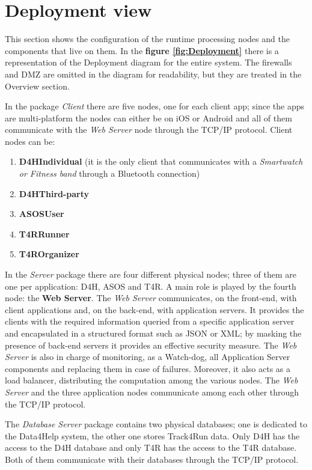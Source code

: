 \section{Deployment view}

This section shows the configuration of the runtime processing nodes and the components that live on them. In the \textbf{figure \ref{fig:Deployment}} there is a representation of the Deployment diagram for the entire system.
The firewalls and DMZ are omitted in the diagram for readability, but they are treated in the Overview section.

In the package \emph{Client} there are five nodes, one for each client app; since the apps are multi-platform the nodes can either be on iOS or Android and all of them communicate with the \emph{Web Server} node through the TCP/IP protocol. 
Client nodes can be:
\begin{enumerate}
    \item \textbf{D4HIndividual} (it is the only client that communicates with a \emph{Smartwatch or Fitness band} through a Bluetooth connection)
    \item \textbf{D4HThird-party}
    \item \textbf{ASOSUser}
    \item \textbf{T4RRunner}
    \item \textbf{T4ROrganizer}
\end{enumerate}

In the \emph{Server} package there are four different physical nodes; three of them are one per application: D4H, ASOS and T4R. A main role is played by the fourth node: the \textbf{Web Server}. The \emph{Web Server} communicates, on the front-end, with client applications and, on the back-end, with application servers. It provides the clients with the required information queried from a specific application server and encapsulated in a structured format such as JSON or XML; by masking the presence of back-end servers it provides an effective security measure. The \emph{Web Server} is also in charge of monitoring, as a Watch-dog, all Application Server components and replacing them in case of failures. Moreover, it also acts as a load balancer, distributing the computation among the various nodes.
The \emph{Web Server} and the three application nodes communicate among each other through the TCP/IP protocol.

The \emph{Database Server} package contains two physical databases; one is dedicated to the Data4Help system, the other one stores Track4Run data. Only D4H has the access to the D4H database and only T4R has the access to the T4R database. Both of them communicate with their databases through the TCP/IP protocol.


